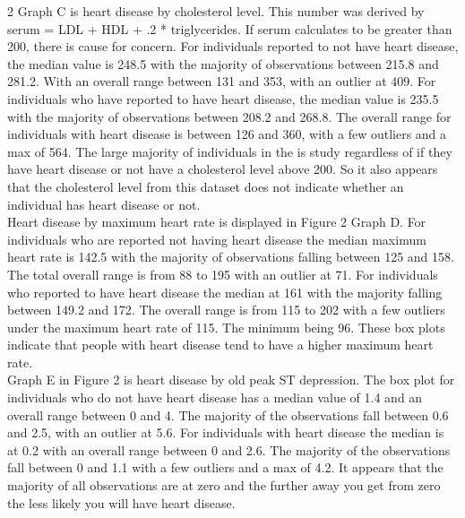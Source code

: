 \documentclass[
]{article}
\begin{document}
2 Graph C is heart disease by cholesterol level. This number was derived
by serum = LDL + HDL + .2 * triglycerides. If serum calculates to be
greater than 200, there is cause for concern. For individuals reported
to not have heart disease, the median value is 248.5 with the majority
of observations between 215.8 and 281.2. With an overall range between
131 and 353, with an outlier at 409. For individuals who have reported
to have heart disease, the median value is 235.5 with the majority of
observations between 208.2 and 268.8. The overall range for individuals
with heart disease is between 126 and 360, with a few outliers and a max
of 564. The large majority of individuals in the is study regardless of
if they have heart disease or not have a cholesterol level above 200. So
it also appears that the cholesterol level from this dataset does not
indicate whether an individual has heart disease or not.\\
\hspace*{0.333em}\hspace*{0.333em}\hspace*{0.333em}\hspace*{0.333em}\hspace*{0.333em}\hspace*{0.333em}Heart
disease by maximum heart rate is displayed in Figure 2 Graph D. For
individuals who are reported not having heart disease the median maximum
heart rate is 142.5 with the majority of observations falling between
125 and 158. The total overall range is from 88 to 195 with an outlier
at 71. For individuals who reported to have heart disease the median at
161 with the majority falling between 149.2 and 172. The overall range
is from 115 to 202 with a few outliers under the maximum heart rate of
115. The minimum being 96. These box plots indicate that people with
heart disease tend to have a higher maximum heart rate.\\
\hspace*{0.333em}\hspace*{0.333em}\hspace*{0.333em}\hspace*{0.333em}\hspace*{0.333em}\hspace*{0.333em}Graph
E in Figure 2 is heart disease by old peak ST depression. The box plot
for individuals who do not have heart disease has a median value of 1.4
and an overall range between 0 and 4. The majority of the observations
fall between 0.6 and 2.5, with an outlier at 5.6. For individuals with
heart disease the median is at 0.2 with an overall range between 0 and
2.6. The majority of the observations fall between 0 and 1.1 with a few
outliers and a max of 4.2. It appears that the majority of all
observations are at zero and the further away you get from zero the less
likely you will have heart disease.
\end{document}
